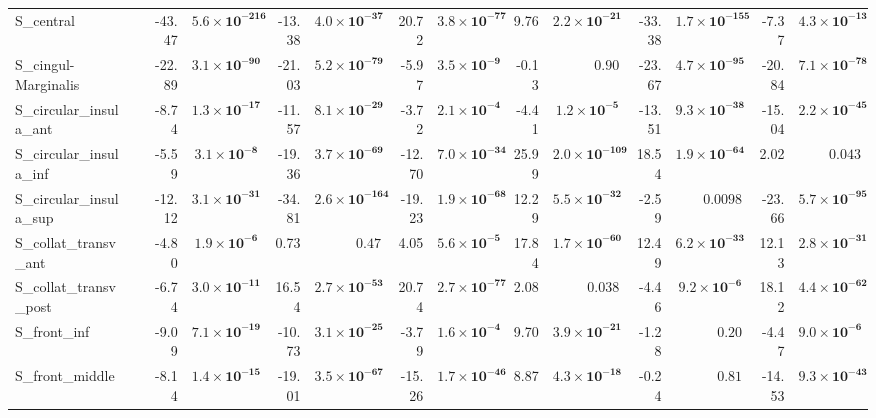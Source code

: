 {\begin{longtable}{llrrrrrrrrrrrr}
S\_central &  & -43.47 & $\mathbf{5.6{\times}10^{-216}}$ & -13.38 & $\mathbf{4.0{\times}10^{-37}}$ & 20.72 & $\mathbf{3.8{\times}10^{-77}}$ & 9.76 & $\mathbf{2.2{\times}10^{-21}}$ & -33.38 & $\mathbf{1.7{\times}10^{-155}}$ & -7.37 & $\mathbf{4.3{\times}10^{-13}}$ \\
S\_cingul-Marginalis &  & -22.89 & $\mathbf{3.1{\times}10^{-90}}$ & -21.03 & $\mathbf{5.2{\times}10^{-79}}$ & -5.97 & $\mathbf{3.5{\times}10^{-9}}$ & -0.13 & $0.90$ & -23.67 & $\mathbf{4.7{\times}10^{-95}}$ & -20.84 & $\mathbf{7.1{\times}10^{-78}}$ \\
S\_circular\_insula\_ant &  & -8.74 & $\mathbf{1.3{\times}10^{-17}}$ & -11.57 & $\mathbf{8.1{\times}10^{-29}}$ & -3.72 & $\mathbf{2.1{\times}10^{-4}}$ & -4.41 & $\mathbf{1.2{\times}10^{-5}}$ & -13.51 & $\mathbf{9.3{\times}10^{-38}}$ & -15.04 & $\mathbf{2.2{\times}10^{-45}}$ \\
S\_circular\_insula\_inf &  & -5.59 & $\mathbf{3.1{\times}10^{-8}}$ & -19.36 & $\mathbf{3.7{\times}10^{-69}}$ & -12.70 & $\mathbf{7.0{\times}10^{-34}}$ & 25.99 & $\mathbf{2.0{\times}10^{-109}}$ & 18.54 & $\mathbf{1.9{\times}10^{-64}}$ & 2.02 & $0.043$ \\
S\_circular\_insula\_sup &  & -12.12 & $\mathbf{3.1{\times}10^{-31}}$ & -34.81 & $\mathbf{2.6{\times}10^{-164}}$ & -19.23 & $\mathbf{1.9{\times}10^{-68}}$ & 12.29 & $\mathbf{5.5{\times}10^{-32}}$ & -2.59 & $0.0098$ & -23.66 & $\mathbf{5.7{\times}10^{-95}}$ \\
S\_collat\_transv\_ant &  & -4.80 & $\mathbf{1.9{\times}10^{-6}}$ & 0.73 & $0.47$ & 4.05 & $\mathbf{5.6{\times}10^{-5}}$ & 17.84 & $\mathbf{1.7{\times}10^{-60}}$ & 12.49 & $\mathbf{6.2{\times}10^{-33}}$ & 12.13 & $\mathbf{2.8{\times}10^{-31}}$ \\
S\_collat\_transv\_post &  & -6.74 & $\mathbf{3.0{\times}10^{-11}}$ & 16.54 & $\mathbf{2.7{\times}10^{-53}}$ & 20.74 & $\mathbf{2.7{\times}10^{-77}}$ & 2.08 & $0.038$ & -4.46 & $\mathbf{9.2{\times}10^{-6}}$ & 18.12 & $\mathbf{4.4{\times}10^{-62}}$ \\
S\_front\_inf &  & -9.09 & $\mathbf{7.1{\times}10^{-19}}$ & -10.73 & $\mathbf{3.1{\times}10^{-25}}$ & -3.79 & $\mathbf{1.6{\times}10^{-4}}$ & 9.70 & $\mathbf{3.9{\times}10^{-21}}$ & -1.28 & $0.20$ & -4.47 & $\mathbf{9.0{\times}10^{-6}}$ \\
S\_front\_middle &  & -8.14 & $\mathbf{1.4{\times}10^{-15}}$ & -19.01 & $\mathbf{3.5{\times}10^{-67}}$ & -15.26 & $\mathbf{1.7{\times}10^{-46}}$ & 8.87 & $\mathbf{4.3{\times}10^{-18}}$ & -0.24 & $0.81$ & -14.53 & $\mathbf{9.3{\times}10^{-43}}$ \\

\end{longtable}}
